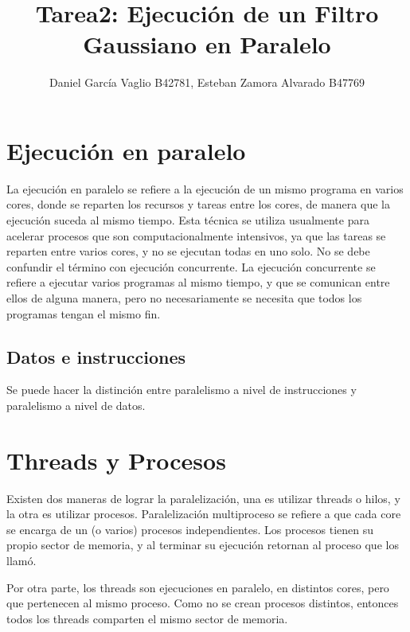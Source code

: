 \documentclass {article}
\begin{document}
\title{Tarea2: Ejecuci\'on de un Filtro Gaussiano en Paralelo}
\author{Daniel García Vaglio B42781, Esteban Zamora Alvarado B47769}

\maketitle

\section{Ejecución en paralelo}

La ejecución en paralelo se refiere a la ejecución de un mismo programa en varios cores, donde
se reparten los recursos y tareas entre los cores, de manera que la ejecución suceda al mismo
tiempo. %
Esta técnica se utiliza  usualmente para acelerar procesos que son computacionalmente intensivos, ya
que las tareas se reparten entre varios cores, y no se ejecutan todas en uno solo. No se debe
confundir el término con ejecución concurrente. %
La ejecución concurrente se refiere a ejecutar varios programas al mismo tiempo, y que se comunican
entre ellos de alguna manera, pero no necesariamente se necesita que todos los programas tengan el
mismo fin.

\subsection{Datos e instrucciones}
Se puede hacer la distinción entre paralelismo a nivel de instrucciones y paralelismo a nivel de
datos.

\section{Threads y Procesos}

Existen dos maneras de lograr la paralelización, una es utilizar threads o hilos, y la otra es
utilizar procesos. Paralelización multiproceso se refiere a que cada core se encarga de un (o varios) procesos
independientes. Los procesos tienen su propio sector de memoria, y al terminar su ejecución retornan
al proceso que los llamó.

Por otra parte, los threads son ejecuciones en paralelo, en distintos cores, pero que pertenecen al
mismo proceso. Como no se crean procesos distintos, entonces todos los threads comparten el mismo
sector de memoria.
\end{document}
